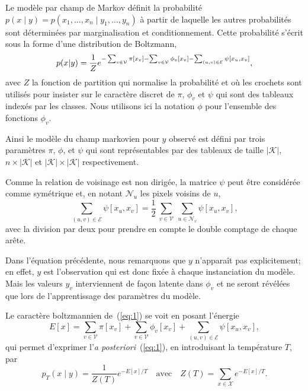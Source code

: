 \documentclass[a4paper,11pt,oneside]{article}
\begin{document}
Le modèle par champ de Markov définit la probabilité $p(x
\mid y) = p(x_1,\ldots,x_n \mid y_1,\ldots,y_n)$ à partir de
laquelle les autres probabilités sont déterminées par
marginalisation et conditionnement. Cette probabilité
s'écrit sous la forme d'une distribution de Boltzmann,
\begin{equation}
  \label{eq:1}
  p(x|y) = \frac1Z e^{%
    - \sum_{v\in\mathcal V} \pi[x_v]%
    - \sum_{v\in\mathcal V} \phi_v[x_v]
    - \sum_{(u,v)\in\mathcal E} \psi[x_u, x_v]},
\end{equation}
avec $Z$ la fonction de partition qui normalise la
probabilité et où les crochets sont utilisés pour insister
sur le caractère discret de $\pi$, $\phi_v$ et $\psi$ qui
sont des tableaux indexés par les classes. Nous utilisons
ici la notation $\phi$ pour l'ensemble des fonctions
$\phi_v$.

Ainsi le modèle du champ markovien pour $y$ observé est
défini par trois paramètres $\pi$, $\phi$, et $\psi$ qui
sont représentables par des tableaux de taille $|\mathcal
K|$, $n\times|\mathcal K|$ et $|\mathcal K|\times|\mathcal
K|$ respectivement.

Comme la relation de voisinage est non dirigée, la matrice
$\psi$ peut être considérée comme symétrique et, en notant
$\mathcal N_u$ les pixels voisins de $u$,
\begin{equation}
  \label{eq:2}
  \sum_{(u,v)\in\mathcal E} \psi[x_u, x_v]
  = \frac12\:
      \sum_{v\in\mathcal V}\:
        \sum_{u\in\mathcal N_v} \psi[x_u, x_v],
\end{equation}
avec la division par deux pour prendre en compte le double
comptage de chaque arête.

Dans l'équation précédente, nous remarquons que $y$
n'apparaît pas explicitement; en effet, $y$ est
l'observation qui est donc fixée à chaque instanciation du
modèle. Mais les valeurs $y_v$ interviennent de façon
latente dans $\phi_v$ et ne seront révélées que lors de
l'apprentissage des paramètres du modèle.

Le caractère boltzmannien de~(\ref{eq:1}) se voit en posant
l'énergie
\begin{equation}
  \label{eq:3}
  E[x] =
  \sum_{v\in\mathcal V} \pi[x_v]
  + \sum_{v\in\mathcal V} \phi_v[x_v]
  + \sum_{(u,v)\in\mathcal E} \psi[x_u, x_v],
\end{equation}
qui permet d'exprimer l'\emph{a posteriori}~(\ref{eq:1}), en
introduisant la température $T$, par
\begin{equation}
  \label{eq:4}
  p_T(x\mid y) = \frac1{Z(T)} e^{-E[x]/T}
  \quad
  \text{avec}\quad Z(T) = \sum_{x\in\mathcal X} e^{-E[x]/T}.
\end{equation}
\end{document}
